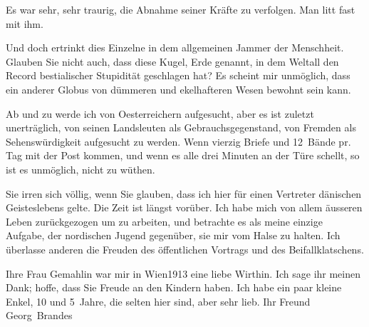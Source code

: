 \pstart
           Es war sehr, sehr traurig, die Abnahme seiner Kräfte zu verfolgen. Man litt fast mit
               ihm.\pend
           
\pstart
           Und doch ertrinkt dies Einzelne in dem allgemeinen Jammer der Menschheit. Glauben Sie
               nicht  auch, dass diese Kugel, Erde genannt, in dem
               Weltall den Record bestialischer Stupidität geschlagen hat? Es scheint mir unmöglich,
               dass ein anderer Globus von dümmeren und ekelhafteren Wesen bewohnt sein kann.\pend
           
\pstart
           Ab und zu werde ich von Oesterreichern
               aufgesucht, aber es ist zuletzt unerträglich, von seinen Landsleuten als
               Gebrauchsgegenstand, {\pb}von Fremden
               als Sehenswürdigkeit aufgesucht zu werden. Wenn vierzig Briefe und 12 Bände pr. Tag
                   mit der Post \introOben{}kommen,\introOben{} und wenn es alle drei Minuten an der Türe schellt, so ist es
               unmöglich, nicht zu wüthen.\pend
           
\pstart
           Sie irren sich völlig, wenn Sie glauben, dass ich hier für einen Vertreter dänischen Geisteslebens gelte. Die Zeit ist
               längst vorüber. Ich habe mich von allem äusseren Leben zurückgezogen um zu arbeiten,
               und betrachte es als meine einzige Aufgabe, der nordischen Jugend gegenüber, sie mir vom Halse zu halten. Ich überlasse
               anderen die Freuden des öffentlichen Vortrags und des Beifallklatschens.\pend
           
\pstart
           Ihre Frau Gemahlin war mir in
                  Wien1913 eine liebe Wirthin. Ich sage ihr meinen Dank; hoffe, dass Sie
               Freude an den Kindern haben. Ich habe ein paar kleine Enkel, 10 und 5 Jahre, die selten hier sind, aber sehr lieb.\pend
           \pstart Ihr Freund \spacefill\mbox{Georg Brandes}\pend{}\endnumbering{}  
      
